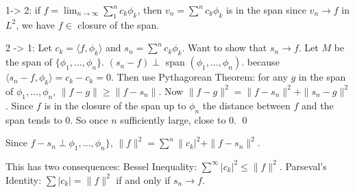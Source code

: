 1-> 2: if $f= \lim_{n \to \infty} \sum_1^n c_k \phi_k$, then $v_n = \sum^n c_k \phi_k$ is in the span since $v_n \to f$ in $L^2$, we have $f \in $ closure of the span. 

2 -> 1: Let $c_k= \langle f, \phi_k \rangle$ and $s_n= \sum^n c_k \phi_k$. Want to show that $s_n \to f$. Let $M$ be the span of $\{\phi_1,\ldots,\phi_n\}$. $(s_n-f) \perp $ span $(\phi_1,\ldots,\phi_n)$. because $\langle s_n -f, \phi_k \rangle= c_k-c_k=0$. Then use Pythagorean Theorem: for any $g$ in the span of $\phi_1,\ldots,\phi_n$, $\|f-g\| \geq \|f-s_n\|$. Now $\|f-g\|^2= \|f-s_n\|^2 + \|s_n-g\|^2$. Since $f$ is in the closure of the span up to $\phi_n$ the distance between $f$ and the span tends to 0. So once $n$ sufficiently large, close to 0. \qed \\


\begin{cor}
Since $f-s_n \perp \phi_1,\ldots,\phi_n\}$, $\|f\|^2= \sum^n \|c_k|^2 + \|f-s_n\|^2$.  
\end{cor}

This has two consequences: Bessel Inequality: $\sum^\infty |c_k|^2 \leq \|f\|^2$. Parseval's Identity: $\sum |c_k| = \|f\|^2$ if and only if $s_n \to f$. 












































